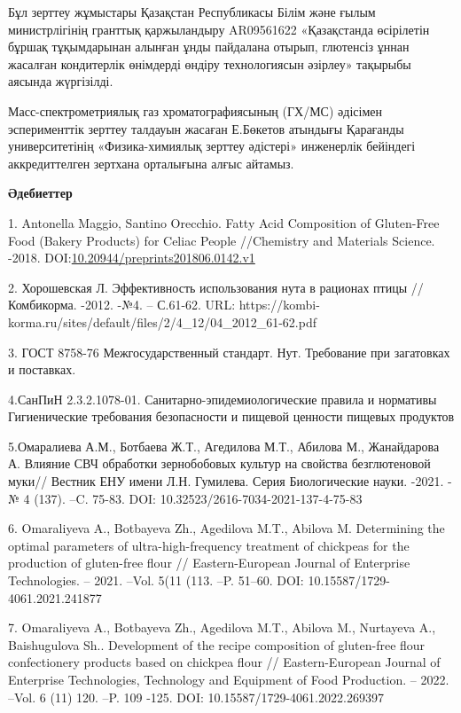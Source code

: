 Бұл зерттеу жұмыстары Қазақстан Республикасы Білім және ғылым
министрлігінің гранттық қаржыландыру AR09561622 «Қазақстанда өсірілетін
бұршақ тұқымдарынан алынған ұнды пайдалана отырып, глютенсіз ұннан
жасалған кондитерлік өнімдерді өндіру технологиясын әзірлеу» тақырыбы
аясында жүргізілді.

Масс-спектрометриялық газ хроматографиясының (ГХ/МС) әдісімен
эсперименттік зерттеу талдауын жасаған Е.Бөкетов атындығы Қарағанды
университетінің «Физика-химиялық зерттеу әдістері» инженерлік бейіндегі
аккредиттелген зертхана орталығына алғыс айтамыз.

{\bfseries Әдебиеттер}

1. Antonella Maggio, Santino Orecchio. Fatty Acid Composition of
Gluten-Free Food (Bakery Products) for Celiac People //Chemistry and
Materials Science. -2018.
DOI:\href{http://dx.doi.org/10.20944/preprints201806.0142.v1}{10.20944/preprints201806.0142.v1}

2. Хорошевская Л. Эффективность использования нута в рационах птицы //
Комбикорма. -2012. -№4. -- С.61-62. URL:
https://kombi-korma.ru/sites/default/files/2/4\_12/04\_2012\_61-62.pdf

3. ГОСТ 8758-76 Межгосударственный стандарт. Нут. Требование при
загатовках и поставках.

4.СанПиН 2.3.2.1078-01. Санитарно-эпидемиологические правила и нормативы
Гигиенические требования безопасности и пищевой ценности пищевых
продуктов

5.Омаралиева А.М., Ботбаева Ж.Т., Агедилова М.Т., Абилова М.,
Жанайдарова А. Влияние СВЧ обработки зернобобовых культур на свойства
безглютеновой муки// Вестник ЕНУ имени Л.Н. Гумилева. Серия
Биологические науки. -2021. -№ 4 (137). --C. 75-83. DOI:
10.32523/2616-7034-2021-137-4-75-83

6. Omaraliyeva A., Botbayeva Zh., Agedilova M.T., Abilova M. Determining
the optimal parameters of ultra-high-frequency treatment of chickpeas
for the production of gluten-free flour // Eastern-European Journal of
Enterprise Technologies. -- 2021. --Vol. 5(11 (113. --P. 51--60. DOI:
10.15587/1729-4061.2021.241877

7. Omaraliyeva A., Botbayeva Zh., Agedilova M.T., Abilova M., Nurtayeva
A., Baishugulova Sh.. Development of the recipe composition of
gluten-free flour confectionery products based on chickpea flour //
Eastern-European Journal of Enterprise Technologies, Technology and
Equipment of Food Production. -- 2022. --Vol. 6 (11) 120. --P. 109 -125.
DOI: 10.15587/1729-4061.2022.269397


